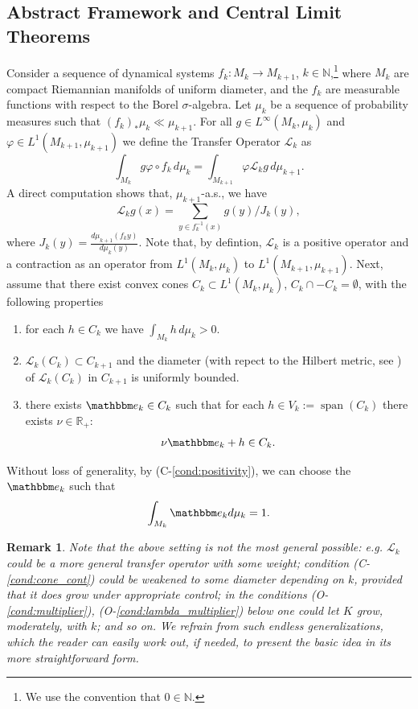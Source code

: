 \documentclass{amsart}
\numberwithin{equation}{section}
\newtheorem{rem}[thm]{Remark}
\newcommand\cL{{\mathcal L}}
\newcommand\bN{{\mathbb N}}
\newcommand\bR{{\mathbb R}}
\newcommand\vf{\varphi}
\newcommand{\bbe}{\mathbbm e}
\begin{document}

\subsection{Abstract Framework and Central Limit Theorems}
\label{sec:abstract}



Consider a sequence of dynamical systems $f_k:M_k\to M_{k+1}$, $k\in\bN$,\footnote{ We use the convention that $0\in\bN$.} where $M_k$ are compact Riemannian manifolds of uniform diameter, and the $f_k$ are measurable functions with respect to the Borel $\sigma$-algebra. Let $\mu_k$ be a sequence of probability measures such that $(f_k)_*\mu_k\ll\mu_{k+1}$.
For all $g\in L^\infty(M_{k}, \mu_k)$ and $\vf\in L^1(M_{k+1},\mu_{k+1})$ we define the Transfer Operator $\cL_k$ as
\begin{equation}\label{eq:transfer_op}
\int_{M_{k}} g\vf \circ f_k \, d\mu_k=\int_{M_{k+1}} \vf \cL_kg \, d\mu_{k+1}.
\end{equation}
A direct computation shows that, $\mu_{k+1}$-a.s., we have
\[
\cL_k g(x) = \sum_{y \in f_k^{-1}(x)} g(y)/J_k(y),
\]
where $J_k(y) = \frac{d\mu_{k+1}(f_k y)}{d\mu_k(y)}$. Note that, by defintion, $\cL_k$ is a positive operator and a contraction as an operator from $L^1(M_k,\mu_k)$ to $L^1(M_{k+1},\mu_{k+1})$.
Next, assume that there exist convex cones $C_k\subset L^1(M_k,\mu_k)$, $C_k\cap -C_k=\emptyset$, with the following properties
\begin{enumerate}[\bf (C-1)]
\item \label{cond:positivity} for each $h\in C_k$ we have $\int_{M_k} h  \, d\mu_k > 0$.
\item \label{cond:cone_cont} $\cL_k (C_{k})\subset C_{k+1}$ and the diameter (with repect to the Hilbert metric, see \cite[Appendix D]{DKL}) of $\cL_k (C_{k})$ in $C_{k+1}$ is uniformly bounded.
\item \label{cond:norm} there exists $\bbe_k\in C_k$ such that for each $h\in V_k:=\operatorname{span}(C_k)$ there exists $\nu\in \bR_+$:
\[ 
\nu \bbe_k +h\in C_k.
\]
\end{enumerate}
Without loss of generality, by (C-\ref{cond:positivity}), we can choose the $\bbe_k$ such that
\begin{equation}\label{eq:normalize_e}
\int_{M_k}\bbe_k d\mu_k=1.
\end{equation}
\begin{rem}
Note that the above setting is not the most general possible: e.g. $\cL_k$ could be a more general transfer operator with some weight; condition (C-\ref{cond:cone_cont}) could be weakened to some diameter depending on $k$, provided that it does grow under appropriate control; in the conditions (O-\ref{cond:multiplier}), (O-\ref{cond:lambda_multiplier}) below one could let $K$ grow, moderately, with $k$; and so on. We refrain from such endless generalizations, which the reader can easily work out, if needed, to present the basic idea in its more straightforward form.
\end{rem} 
\end{document}
